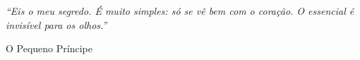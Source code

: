 \epigraph{
    \vspace{20cm}
    \emph{
        ``Eis o meu segredo. É muito simples: só se vê bem com o coração. O essencial é invisível para os olhos.''
    }
}{O Pequeno Príncipe}